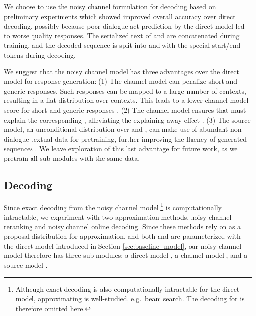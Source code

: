 \documentclass[11pt,a4paper]{article}
\begin{document}
We choose to use the noisy channel formulation for decoding  based on preliminary experiments which showed improved overall accuracy over direct decoding, possibly because poor dialogue act prediction by the direct model led to worse quality responses. The 
serialized text of  and  are concatenated during training, and the decoded sequence is split into  and  with the special start/end tokens during decoding.





We suggest that the noisy channel model has three advantages over the direct model for response generation: (1) The channel model can penalize short and generic responses. Such responses can be mapped to a large number of contexts, resulting in a flat distribution over contexts. This leads to a lower channel model score for short and generic responses \cite{zhang2019dialogpt}. (2) The channel model ensures that  must explain the corresponding , alleviating the explaining-away effect \cite{yu2016neural}. (3) The source model, an unconditional distribution over  and , can make use of abundant non-dialogue textual data for pretraining, further improving the fluency of generated sequences \cite{brants2007large}. We leave exploration of this last advantage for future work, as we pretrain all sub-modules with the same data.





\subsection{Decoding}
\label{sec:decoding}

Since exact decoding from the noisy channel model \footnote{Although exact decoding is also computationally intractable for the direct model, approximating  is well-studied, e.g.\ beam search. The decoding for  is therefore omitted here.} is computationally intractable, we experiment with two approximation methods, noisy channel reranking and noisy channel online decoding. Since these methods rely on  as a proposal distribution for approximation, and both  and  are parameterized with the direct model introduced in Section \ref{sec:baseline_model}, our noisy channel model therefore has three sub-modules: a direct model , a channel model , and a source model .
\end{document}
